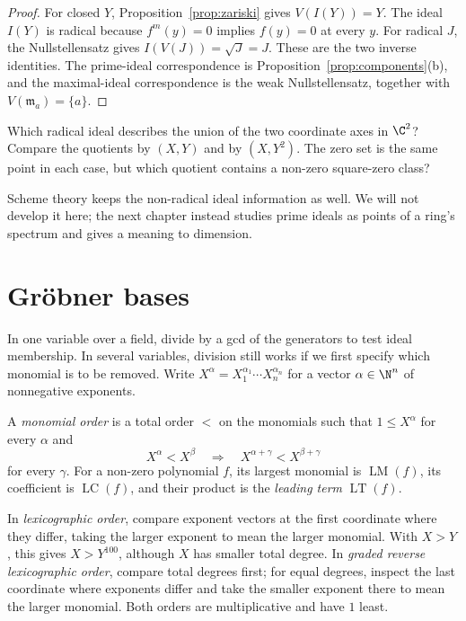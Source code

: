 \begin{proof}
For closed $Y$, Proposition~\ref{prop:zariski} gives $V(I(Y))=Y$. The ideal $I(Y)$ is radical because $f^m(y)=0$ implies $f(y)=0$ at every $y$. For radical $J$, the Nullstellensatz gives $I(V(J))=\sqrt J=J$. These are the two inverse identities. The prime-ideal correspondence is Proposition~\ref{prop:components}(b), and the maximal-ideal correspondence is the weak Nullstellensatz, together with $V(\mathfrak m_a)=\{a\}$.
\end{proof}

\begin{think}
Which radical ideal describes the union of the two coordinate axes in $\C^2$? Compare the quotients by $(X,Y)$ and by $(X,Y^2)$. The zero set is the same point in each case, but which quotient contains a non-zero square-zero class?
\end{think}

Scheme theory keeps the non-radical ideal information as well. We will not develop it here; the next chapter instead studies prime ideals as points of a ring's spectrum and gives a meaning to dimension.

\section{Gröbner bases}

In one variable over a field, divide by a gcd of the generators to test ideal membership. In several variables, division still works if we first specify which monomial is to be removed. Write $X^\alpha=X_1^{\alpha_1}\cdots X_n^{\alpha_n}$ for a vector $\alpha\in\N^n$ of nonnegative exponents.

\begin{definition}\label{def:monomialorder}
A \emph{monomial order} is a total order $<$ on the monomials such that $1\le X^\alpha$ for every $\alpha$ and
\[
X^\alpha<X^\beta\quad\Longrightarrow\quad
X^{\alpha+\gamma}<X^{\beta+\gamma}
\]
for every $\gamma$. For a non-zero polynomial $f$, its largest monomial is $\operatorname{LM}(f)$, its coefficient is $\operatorname{LC}(f)$, and their product is the \emph{leading term} $\operatorname{LT}(f)$.
\end{definition}

In \emph{lexicographic order}, compare exponent vectors at the first coordinate where they differ, taking the larger exponent to mean the larger monomial. With $X>Y$, this gives $X>Y^{100}$, although $X$ has smaller total degree. In \emph{graded reverse lexicographic order}, compare total degrees first; for equal degrees, inspect the last coordinate where exponents differ and take the smaller exponent there to mean the larger monomial. Both orders are multiplicative and have $1$ least.

